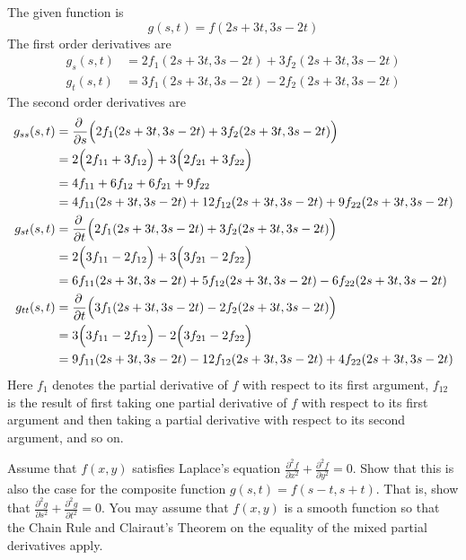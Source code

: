 \begin{solution}
The given function is
\begin{equation*}
g(s,t)=f(2s+3t,3s-2t)
\end{equation*}
The first order derivatives are
\begin{align*}
g_s(s,t)&=2f_1(2s+3t,3s-2t)+3f_2(2s+3t,3s-2t)\\
g_t(s,t)&=3f_1(2s+3t,3s-2t)-2f_2(2s+3t,3s-2t)
\end{align*}
The second order derivatives are
\begin{align*}
g_{ss}(s,t)
      &=\pdiff{}{s}\Big(2f_1(2s+3t,3s-2t)+3f_2(2s+3t,3s-2t)\Big)\\
      &=2\Big(2f_{11}+3f_{12}\Big)
        +3\Big(2f_{21}+3f_{22}\Big)\\
      &=4f_{11}+6f_{12}+6f_{21}+9f_{22}\\
      &=4f_{11}(2s+3t,3s-2t)+12f_{12}(2s+3t,3s-2t)+9f_{22}(2s+3t,3s-2t)\\
g_{st}(s,t)&=\pdiff{}{t}\Big(2f_1(2s+3t,3s-2t)+3f_2(2s+3t,3s-2t)\Big)\\
     &=2\Big(3f_{11}-2f_{12}\Big)
        +3\Big(3f_{21}-2f_{22}\Big)\\
     &=6f_{11}(2s+3t,3s-2t)+5f_{12}(2s+3t,3s-2t)-6f_{22}(2s+3t,3s-2t)\\
g_{tt}(s,t)&=\pdiff{}{t}\Big(3f_1(2s+3t,3s-2t)-2f_2(2s+3t,3s-2t)\Big)\\
     &=3\Big(3f_{11}-2f_{12}\Big)
        -2\Big(3f_{21}-2f_{22}\Big)\\
     &=9f_{11}(2s+3t,3s-2t)-12f_{12}(2s+3t,3s-2t)+4f_{22}(2s+3t,3s-2t)
\end{align*}
Here $f_1$ denotes the partial derivative of $f$ with respect to its first
argument, $f_{12}$ is the result of first taking one partial derivative
of $f$ with respect to its first argument and then taking a partial derivative
with respect to its second argument, and so on.  

\end{solution}


\begin{question}[M200 2005D] %
Assume that $f(x,y)$ satisfies Laplace's equation 
$\frac{\partial^2 f}{\partial x^2}+\frac{\partial^2 f}{\partial y^2}=0$.
Show that this is also the case for the composite function 
$g(s,t) = f (s - t, s + t)$. That is, show that
$\frac{\partial^2 g}{\partial s^2}+\frac{\partial^2 g}{\partial t^2}=0$.
You may assume that $f(x,y)$ is a smooth function so that the 
Chain Rule and Clairaut's Theorem on the equality of the mixed partial derivatives apply.
\end{question}

